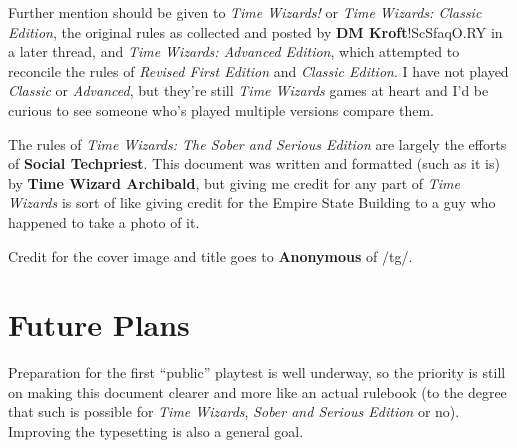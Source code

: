 \documentclass[twoside]{article}
\newcommand{\twsse}{\emph{Time Wizards: The Sober and Serious Edition}}
\newcommand{\tw}{\emph{Time Wizards}}
\newcommand{\sse}{\emph{Sober and Serious Edition}}
\newcommand{\rfe}{\emph{Revised First Edition}}
\newcommand{\anon}[1][]{{\color{anongreen} \textbf{Anonymous}#1}}
\newcommand{\namefag}[2][]{{\color{anongreen} \textbf{#2}#1}}
\begin{document}
Further mention should be given to \emph{Time Wizards!} or \emph{Time Wizards: Classic Edition},
the original rules as collected and posted by \namefag[!ScSfaqO.RY]{DM Kroft} in a later thread,
and \emph{Time Wizards: Advanced Edition}, which attempted to reconcile the rules of \rfe{} and
\emph{Classic Edition}. I have not played \emph{Classic} or \emph{Advanced}, but they're still
\tw{} games at heart and I'd be curious to see someone who's played multiple versions compare
them.

The rules of \twsse{} are largely the efforts of \namefag{Social Techpriest}. This document was
written and formatted (such as it is) by \namefag{Time Wizard Archibald}, but giving me credit
for any part of \tw{} is sort of like giving credit for the Empire State Building to a guy who
happened to take a photo of it.

Credit for the cover image and title goes to \anon{} of /tg/.

\section{Future Plans}
Preparation for the first ``public'' playtest is well underway, so the priority is still on
making this document clearer and more like an actual rulebook (to the degree that such is
possible for \tw{}, \sse{} or no). Improving the typesetting is also a general goal.
\end{document}
